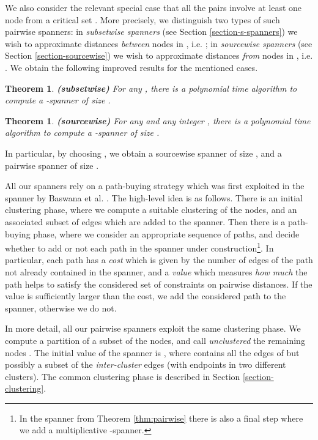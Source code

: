\documentclass[a4paper,11pt]{article}
\newtheorem{theorem}[lemma]{Theorem}
\theoremstyle{definition}
\begin{document}
We also consider the relevant special case that all the pairs involve at least one node from a critical set . More precisely, we distinguish two types of such pairwise spanners: in \emph{subsetwise spanners} (see Section \ref{section-s-spanners}) we wish to approximate distances \emph{between} nodes in , i.e. ; in \emph{sourcewise spanners} (see Section \ref{section-sourcewise}) we wish to approximate distances \emph{from} nodes in , i.e. . We obtain the following improved results for the mentioned cases. 

\begin{theorem}
\label{thm:s-spanners} {\bf (subsetwise)}
For any , there is a polynomial time algorithm to compute a  -spanner of size . 
\end{theorem}
\begin{theorem}
\label{thm:sourcewise} {\bf (sourcewise)}
For any  and any integer , there is a polynomial time algorithm to compute a  -spanner of size  .
\end{theorem}


In particular, by choosing , we obtain a  sourcewise spanner of size  , and a 
 pairwise spanner of size
.

All our spanners rely on a path-buying strategy which was first exploited in the  spanner by Baswana et al. \cite{BKMP05}.
The high-level idea is as follows. There is an initial clustering phase, where we compute a suitable clustering of the nodes, and an associated subset of edges which are added to the spanner. Then there is a path-buying phase, where we consider an appropriate sequence of paths, and decide whether to add or not each path in the spanner under construction\footnote{In the spanner from Theorem \ref{thm:pairwise} there is also a final step where we add a  multiplicative -spanner.}. In particular, each path has a \emph{cost}  which is given by the number of edges of the path not already contained in the spanner, and a \emph{value} which measures \emph{how much} the path helps to satisfy the considered set of constraints on pairwise distances. If the value is sufficiently larger than the cost, we add the considered path to the spanner, otherwise we do not.

In more detail, all our pairwise spanners exploit the same clustering phase. We compute a partition  of a subset of the nodes, and call \emph{unclustered} the remaining nodes . The initial value of the spanner is , where  contains all the edges of  but possibly a subset of the \emph{inter-cluster} edges (with endpoints in two different clusters).
The common clustering phase is described in Section \ref{section-clustering}.
\end{document}
